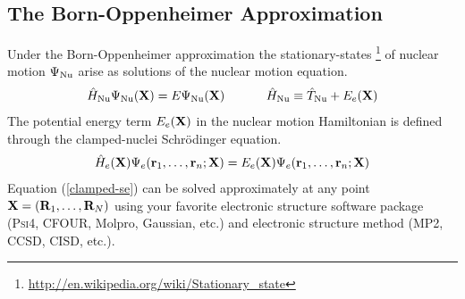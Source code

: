 \documentclass[11pt]{article}
\begin{document}
\subsection{The Born-Oppenheimer Approximation}
Under the Born-Oppenheimer approximation the stationary-states \footnote{\url{http://en.wikipedia.org/wiki/Stationary_state}} of nuclear motion $\Psi_{\mathrm{Nu}}$ arise as solutions of the nuclear motion equation.
\begin{align}
\label{pes}
	\hat{H}_{\mathrm{Nu}}
	\Psi_{\mathrm{Nu}}(\mathbf{X})
=
	E
	\Psi_{\mathrm{Nu}}(\mathbf{X})
\ \ \ \ \ \ \ \ \ \ 
	\hat{H}_{\mathrm{Nu}}
\equiv
	\hat{T}_{\mathrm{Nu}}+E_e(\mathbf{X})
\end{align}
The potential energy term $E_e(\mathbf{X})$ in the nuclear motion Hamiltonian is defined through the clamped-nuclei Schr\"odinger equation.
\begin{align}
\label{clamped-se}
	\hat{H}_e(\mathbf{X})
	\Psi_e(\mathbf{r}_1,\ldots,\mathbf{r}_n;\mathbf{X})
=
	E_e(\mathbf{X})
	\Psi_e(\mathbf{r}_1,\ldots,\mathbf{r}_n;\mathbf{X})
\end{align}
Equation (\ref{clamped-se}) can be solved approximately at any point $\mathbf{X}=(\mathbf{R}_1,\ldots,\mathbf{R}_N)$ using your favorite electronic structure software package (\textsc{Psi4}, CFOUR, Molpro, Gaussian, etc.) and electronic structure method (MP2, CCSD, CISD, etc.).
\end{document}
